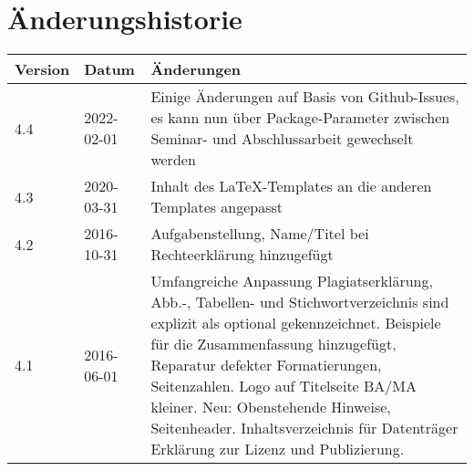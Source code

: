\section*{Änderungshistorie}


\begin{tabularx}{\textwidth}{@{}llX@{}}
\toprule
\bfseries Version & \bfseries Datum & \bfseries Änderungen \\
\midrule
4.4 & 2022-02-01 & Einige Änderungen auf Basis von Github-Issues, es kann nun über Package-Parameter zwischen Seminar- und Abschlussarbeit gewechselt werden \\
\midrule
4.3 & 2020-03-31 & Inhalt des \LaTeX-Templates an die anderen Templates angepasst \\
\midrule
4.2 & 2016-10-31 & Aufgabenstellung, Name/Titel bei Rechteerklärung hinzugefügt \\
\midrule
4.1 & 2016-06-01 & Umfangreiche Anpassung Plagiatserklärung, Abb.-, Tabellen- und Stichwortverzeichnis sind explizit als optional gekennzeichnet. Beispiele für die Zusammenfassung hinzugefügt, Reparatur defekter Formatierungen, Seitenzahlen. Logo auf Titelseite BA/MA kleiner.
Neu: Obenstehende Hinweise, Seitenheader. Inhaltsverzeichnis für Datenträger Erklärung zur Lizenz und Publizierung. \\
\bottomrule
\end{tabularx}

